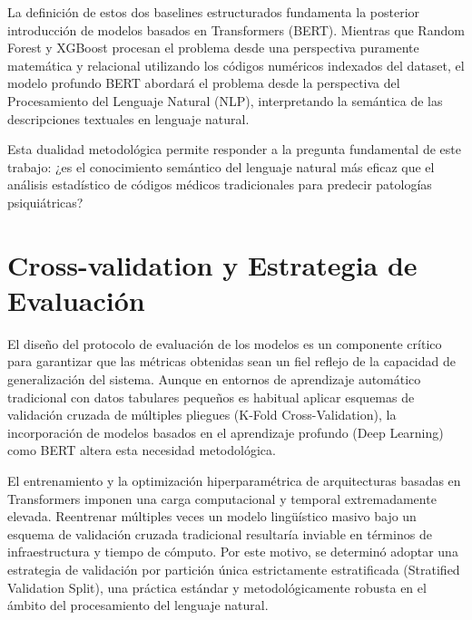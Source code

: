 \documentclass[12pt,a4paper,onecolumn,oneside]{report}
\begin{document}
La definición de estos dos baselines estructurados fundamenta la posterior introducción de modelos basados en Transformers (BERT). Mientras que Random Forest y XGBoost procesan el problema desde una perspectiva puramente matemática y relacional utilizando los códigos numéricos indexados del dataset, el modelo profundo BERT abordará el problema desde la perspectiva del Procesamiento del Lenguaje Natural (NLP), interpretando la semántica de las descripciones textuales en lenguaje natural.

Esta dualidad metodológica permite responder a la pregunta fundamental de este trabajo: ¿es el conocimiento semántico del lenguaje natural más eficaz que el análisis estadístico de códigos médicos tradicionales para predecir patologías psiquiátricas?

\section{Cross-validation y Estrategia de Evaluación}

El diseño del protocolo de evaluación de los modelos es un componente crítico para garantizar que las métricas obtenidas sean un fiel reflejo de la capacidad de generalización del sistema. Aunque en entornos de aprendizaje automático tradicional con datos tabulares pequeños es habitual aplicar esquemas de validación cruzada de múltiples pliegues (K-Fold Cross-Validation), la incorporación de modelos basados en el aprendizaje profundo (Deep Learning) como BERT altera esta necesidad metodológica.

El entrenamiento y la optimización hiperparamétrica de arquitecturas basadas en Transformers imponen una carga computacional y temporal extremadamente elevada. Reentrenar múltiples veces un modelo lingüístico masivo bajo un esquema de validación cruzada tradicional resultaría inviable en términos de infraestructura y tiempo de cómputo. Por este motivo, se determinó adoptar una estrategia de validación por partición única estrictamente estratificada (Stratified Validation Split), una práctica estándar y metodológicamente robusta en el ámbito del procesamiento del lenguaje natural.
\end{document}
